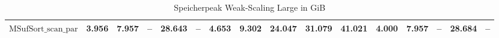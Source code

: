 \begin{table}
{\begin{tabular}{lrrrrrrrrrrrrrrr}
    $\text{MSufSort\_scan\_par}$ & {\color{green!60!black}3.956} & {\color{green!60!black}7.957} & {\color{darkgray}--} & {\color{green!60!black}28.643} & {\color{darkgray}--} & 4.653 & 9.302 & {\color{green!60!black}24.047} & {\color{green!60!black}31.079} & {\color{green!60!black}41.021} & {\color{green!60!black}4.000} & {\color{green!60!black}7.957} & {\color{darkgray}--} & {\color{green!60!black}28.684} & {\color{darkgray}--} \\
\bottomrule
\end{tabular}
}
\caption{Speicherpeak Weak-Scaling Large in GiB}
\label{messung:tab:mem-weak-large}
\end{table}

